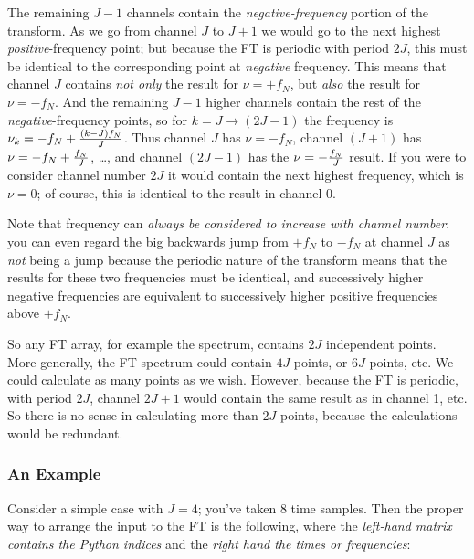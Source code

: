 \documentclass[preprint]{aastex}
\begin{document}
          The remaining $J-1$ channels contain the {\it
negative-frequency} portion of the transform.  As we go from channel $J$
to $J+1$ we would go to the next highest {\it positive}-frequency point;
but because the FT is periodic with period $2J$, this must be identical
to the corresponding point at {\it negative} frequency.  This means that
channel $J$ contains {\it not only} the result for $\nu = +f_N$, but {\it
also} the result for $\nu = -f_N$.  And the remaining $J-1$ higher
channels contain the rest of the {\it negative}-frequency points, so for
$k = J \rightarrow (2J-1)$ the frequency is $\nu _k = -f_N + {(k - J) f_N
\over J}$.  Thus channel $J$ has $\nu = -f_N$, channel $(J+1)$ has $\nu =
-f_N + {f_N \over J}$, \dots, and channel $(2J-1)$ has the $\nu = -{f_N
\over J}$ result.  If you were to consider channel number $2J$ it would
contain the next highest frequency, which is $\nu = 0$; of course, this
is identical to the result in channel 0. 

          Note that frequency can {\it always be considered to increase
with channel number}: you can even regard the big backwards jump from
$+f_N$ to $-f_N$ at channel $J$ as {\it not} being a jump because the
periodic nature of the transform means that the results for these two
frequencies must be identical, and successively higher negative
frequencies are equivalent to successively higher positive frequencies
above $+f_N$. 

          So any FT array, for example the spectrum, contains $2J$
independent points.  More generally, the FT spectrum could contain $4J$
points, or $6J$ points, etc.  We could calculate as many points as we
wish.  However, because the FT is periodic, with period $2J$, channel
$2J+1$ would contain the same result as in channel 1, etc.  So there is
no sense in calculating more than $2J$ points, because the calculations
would be redundant. 

\subsubsection{An Example}

          Consider a simple case with $J=4$; you've taken 8 time
samples.  Then the proper way to arrange the input to the FT is the
following, where the {\it left-hand matrix contains the Python indices} and
the {\it right hand the times or frequencies}:
\end{document}
